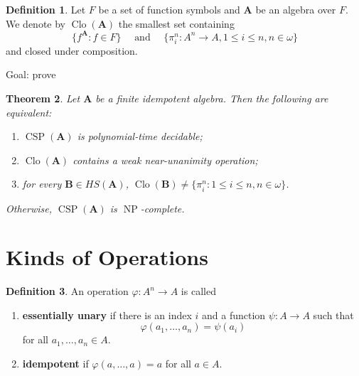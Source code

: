 \documentclass{amsart}
\theoremstyle{plain}
\newtheorem{theorem}{Theorem}[section]
\theoremstyle{definition}
\newtheorem{definition}[theorem]{Definition}
\theoremstyle{remark}
\def\phi{\varphi}
\DeclareMathOperator{\Clo}{Clo}
\DeclareMathOperator{\CSP}{CSP}
\DeclareMathOperator{\NP}{NP}
\begin{document}
\begin{definition}
    Let $F$ be a set of function symbols and $\mathbf{A}$ be an algebra over $F$. 
    We denote by $\Clo(\mathbf{A})$ the smallest set containing 
    \begin{equation*}
        \{f^\mathbf{A}: f \in F\} \quad \text{ and } \quad \{\pi^n_i: A^n \to A, 1 \le i \le n, n \in \omega\}
    \end{equation*}
and closed under composition. 
\end{definition}

Goal: prove 

\begin{theorem}
    Let $\mathbf{A}$ be a finite idempotent algebra. 
    Then the following are equivalent: 
    \begin{enumerate}
        \item $\CSP(\mathbf{A})$ is polynomial-time decidable; 
        \item $\Clo(\mathbf{A})$ contains a weak near-unanimity operation; 
        \item for every $\mathbf{B} \in HS(\mathbf{A})$, $\Clo(\mathbf{B}) \neq \{\pi^n_i: 1 \le i \le n, n \in \omega\}$. 
    \end{enumerate}
    Otherwise, $\CSP(\mathbf{A})$ is $\NP$-complete. 
\end{theorem}

\section{Kinds of Operations}

\begin{definition}
    An operation $\phi: A^n \to A$ is called 
    \begin{enumerate}
        \item \textbf{essentially unary} if there is an index $i$ and a function $\psi: A \to A$ such that 
        \begin{equation*}
        \phi(a_1, \ldots, a_n) = \psi(a_i)
        \end{equation*}
        for all $a_1, \ldots, a_n \in A$. 
        \item \textbf{idempotent} if $\phi(a, \ldots, a)=a$ for all $a \in A$. 
    \end{enumerate}
\end{definition}
\end{document}
